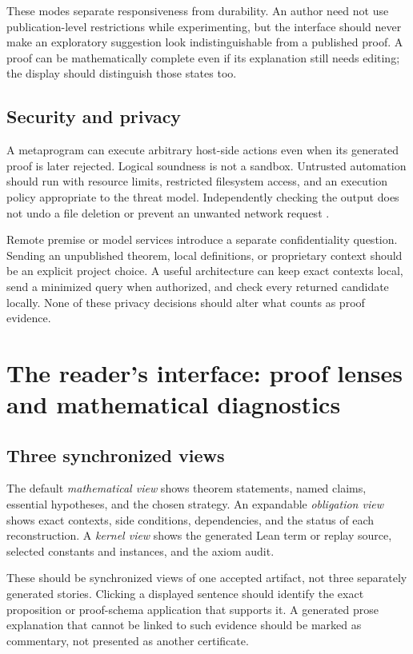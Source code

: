 \documentclass[11pt,a4paper]{article}
\theoremstyle{remark}
\begin{document}
These modes separate responsiveness from durability. An author need not use publication-level restrictions while experimenting, but the interface should never make an exploratory suggestion look indistinguishable from a published proof. A proof can be mathematically complete even if its explanation still needs editing; the display should distinguish those states too.

\subsection{Security and privacy}

A metaprogram can execute arbitrary host-side actions even when its generated proof is later rejected. Logical soundness is not a sandbox. Untrusted automation should run with resource limits, restricted filesystem access, and an execution policy appropriate to the threat model. Independently checking the output does not undo a file deletion or prevent an unwanted network request \cite{lean-validation}.

Remote premise or model services introduce a separate confidentiality question. Sending an unpublished theorem, local definitions, or proprietary context should be an explicit project choice. A useful architecture can keep exact contexts local, send a minimized query when authorized, and check every returned candidate locally. None of these privacy decisions should alter what counts as proof evidence.

\section{The reader's interface: proof lenses and mathematical diagnostics}\label{sec:ui}

\subsection{Three synchronized views}

The default \emph{mathematical view} shows theorem statements, named claims, essential hypotheses, and the chosen strategy. An expandable \emph{obligation view} shows exact contexts, side conditions, dependencies, and the status of each reconstruction. A \emph{kernel view} shows the generated Lean term or replay source, selected constants and instances, and the axiom audit.

These should be synchronized views of one accepted artifact, not three separately generated stories. Clicking a displayed sentence should identify the exact proposition or proof-schema application that supports it. A generated prose explanation that cannot be linked to such evidence should be marked as commentary, not presented as another certificate.
\end{document}

